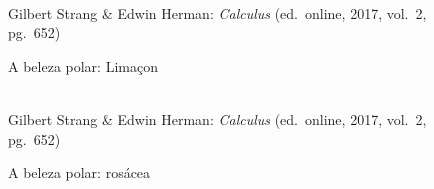 \begin{figure}[H]
  \begin{center}
    \caption{A beleza polar: Limaçon}
    \label{fig:belo3}
    \\
    \footnotesize{Gilbert Strang \& Edwin Herman: \emph{Calculus}
         (ed.\ online, 2017, vol.\ 2, pg.\ 652)}
  \end{center}
\end{figure}

\begin{figure}[H]
  \begin{center}
    \caption{A beleza polar: rosácea}
    \label{fig:belo4}
    \\
    \footnotesize{Gilbert Strang \& Edwin Herman: \emph{Calculus}
          (ed.\ online, 2017, vol.\ 2, pg.\ 652)}
  \end{center}
\end{figure}

